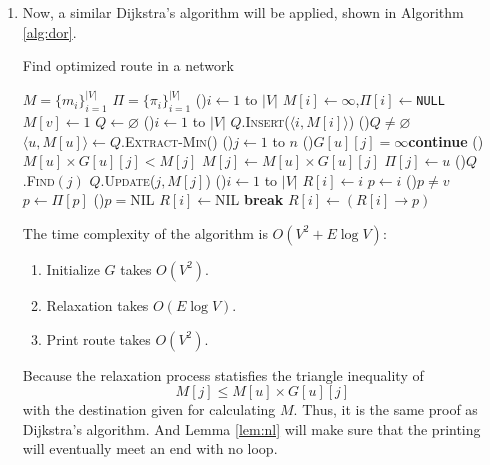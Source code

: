 \documentclass[12pt,a4paper]{article}
\makeatletter
\newtheorem*{solution}{Solution}
\theoremstyle{definition}
\renewenvironment{solution}[1][Solution] {\par\pushQED{\qed}\normalfont\topsep6\p@\@plus6\p@\relax\trivlist\item[\hskip\labelsep\bfseries#1\@addpunct{.}]\ignorespaces}{\popQED\endtrivlist\@endpefalse} \makeatother
\makeatother
\begin{document}
\begin{enumerate}
\begin{solution}
		Now, a similar Dijkstra's algorithm will be applied, shown in Algorithm \ref{alg:dor}.
		\begin{algorithm}[h]
			\caption{Find optimized route in a network}
			\label{alg:dor}
			\BlankLine
			$M = \{m_i\}_{i=1}^{|V|}$ 
			$\Pi = \{\pi_i\}_{i=1}^{|V|}$\;
			\For(){$i\leftarrow 1$ to $|V|$}{
				$M[i]\leftarrow \infty$,$\Pi[i]\leftarrow $\texttt{NULL}\;
			}
			$M[v]\leftarrow 1$\;
			$Q\leftarrow \varnothing$ 
			\For(){$i\leftarrow 1$ to $|V|$}{
				$Q$.\textsc{Insert}($\langle i,M[i]\rangle$)\;
			}
			\While(){$Q\neq \varnothing$}{
				$\langle u,M[u]\rangle\leftarrow Q$.\textsc{Extract-Min}()\;
				\For(){$j\leftarrow 1$ to $n$}{
					\lIf(){$G[u][j]=\infty$}{\textbf{continue}}
					\If(){$M[u]\times G[u][j]<M[j]$}{
						$M[j]\leftarrow M[u]\times G[u][j]$ 
						$\Pi[j]\leftarrow u$\;
						\If(){$Q$.\textsc{Find}$(j)$}{
							$Q$.\textsc{Update}($j,M[j]$)\;
						}
					}
				}
			}
			\For(){$i\leftarrow 1$ to $|V|$}{
				$R[i]\leftarrow i$ 
				$p\leftarrow i$\;
				\While(){$p\neq v$}{
					$p\leftarrow \Pi[p]$\;
					\If(){$p=$\textsc{NIL}}{
						$R[i]\leftarrow$\textsc{NIL} 
						\textbf{break}\;
					}
					$R[i]\leftarrow (R[i]\rightarrow p)$\;
				}
			}
		\end{algorithm}

		The time complexity of the algorithm is $O(V^2+E\log V)$:
		\begin{enumerate}
			\item Initialize $G$ takes $O(V^2)$.
			\item Relaxation takes $O(E\log V)$. 
			\item Print route takes $O(V^2)$.
		\end{enumerate}

		Because the relaxation process statisfies the triangle inequality of
		\begin{equation*}
			M[j]\leq M[u]\times G[u][j]
		\end{equation*}
		with the destination given for calculating $M$. Thus, it is the same proof as Dijkstra's algorithm. And Lemma \ref{lem:nl} will make sure that the printing will eventually meet an end with no loop.
	\end{solution}
	

\end{enumerate}
\end{document}
